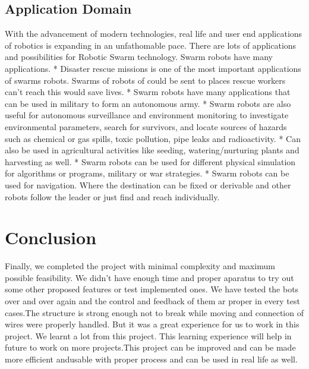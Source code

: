 \documentclass{Resources/UoBLab1}
\begin{document}
\subsection{Application Domain}
With the advancement of modern technologies, real life and user end applications of robotics is expanding in an unfathomable pace. There are lots of applications and possibilities for Robotic Swarm technology. Swarm robots have many applications.\newline
* Disaster rescue missions is one of the most important applications of swarms robots. Swarms of robots of could be sent to places rescue workers can't reach this would save lives. \newline
* Swarm robots have many applications that can be used in military to form an autonomous army.  \newline
* Swarm robots are also useful for autonomous surveillance and environment monitoring to investigate environmental parameters, search for survivors, and locate sources of hazards such as chemical or gas spills, toxic pollution, pipe leaks and radioactivity.\newline
* Can also be used in agricultural activities like seeding, watering/nurturing plants and harvesting as well.\newline
* Swarm robots can be used for different physical simulation for algorithms or programs, military or war strategies.\newline
* Swarm robots can be used for navigation. Where the destination can be fixed or derivable and other robots follow the leader or just find and reach individually.

\section{Conclusion}
Finally, we completed the project with minimal complexity and maximum possible feasibility. We didn't have enough time and proper aparatus to try out some other proposed features or test implemented ones. 
We have tested the bots over and over again and the control and feedback of them ar proper in every test cases.The structure is strong enough not to break while moving and connection of wires were properly handled.\newline
But it was a great experience for us to work in this project. We learnt a lot from this project. This learning experience will help in future to work on more projects.This project can be improved and can be made more efficient andusable with proper process and can be used in real life as well.
\end{document}
